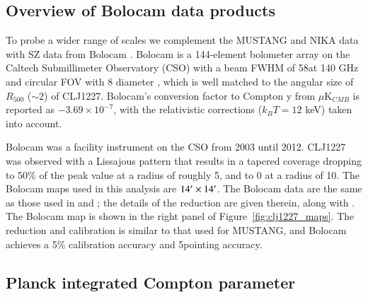 \documentclass[onecolumn,traditabstract]{aa}
\begin{document}
\subsection{Overview of Bolocam data products}
\label{sec:bolocamobs}

To probe a wider range of scales we complement the MUSTANG and NIKA data with SZ data from Bolocam \citep{glenn1998}. 
Bolocam is a 144-element bolometer
array on the Caltech Submillimeter Observatory (CSO) with a beam FWHM of 58\asecs at 140 GHz and circular FOV with 8\amins 
diameter \citep{glenn1998,haig2004}, which is well matched to the angular size of $R_{500}$ ($\sim 2$\amin) of CLJ1227. 
Bolocam's conversion factor to Compton y from $\mu$K$_{CMB}$ is reported as $-3.69 \times 10^{-7}$, with the relativistic
corrections ($k_B T = 12$ keV) taken into account.

Bolocam was a facility instrument on the CSO from
2003 until 2012. CLJ1227 was observed with a Lissajous pattern that results in a tapered
coverage dropping to 50\% of the peak value at a radius of roughly 5\amin, and to 0 at a radius of 10\amin.
The Bolocam maps used in this analysis are $14\hbox{$^\prime$} \times 14\hbox{$^\prime$}$. The Bolocam data 
are the same as those used in \citet{czakon2015} and \citet{sayers2013}; the details of the reduction are 
given therein, along with \citet{sayers2011}. The Bolocam map is shown in the right panel of Figure~\ref{fig:clj1227_maps}.
The reduction and calibration is similar to that used for MUSTANG, and Bolocam achieves a 
5\% calibration accuracy and 5\asecs pointing accuracy.


\subsection{Planck integrated Compton parameter}
\label{sec:picp}
\end{document}
